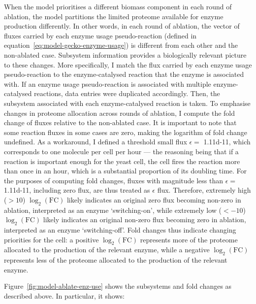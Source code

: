 When the model prioritises a different biomass component in each round of ablation, the model partitions the limited proteome available for enzyme production differently.
In other words, in each round of ablation, the vector of fluxes carried by each enzyme usage pseudo-reaction (defined in equation~\ref{eq:model-gecko-enzyme-usage}) is different from each other and the non-ablated case.
Subsystem information provides a biologically relevant picture to these changes.
More specifically, I match the flux carried by each enzyme usage pseudo-reaction to the enzyme-catalysed reaction that the enzyme is associated with.
If an enzyme usage pseudo-reaction is associated with multiple enzyme-catalysed reactions, data entries were duplicated accordingly.
Then, the subsystem associated with each enzyme-catalysed reaction is taken.
To emphasise changes in proteome allocation across rounds of ablation, I compute the fold change of fluxes relative to the non-ablated case.
It is important to note that some reaction fluxes in some cases are zero, making the logarithm of fold change undefined.
As a workaround, I defined a threshold small flux $\epsilon = $ \SI{1.11d-11}{\mmolgdwh}, which corresponds to one molecule per cell per hour --- the reasoning being that if a reaction is important enough for the yeast cell, the cell fires the reaction more than once in an hour, which is a substantial proportion of its doubling time.
For the purposes of computing fold changes, fluxes with magnitude less than $\epsilon = $ \SI{1.11d-11}{\mmolgdw}, including zero flux, are thus treated as $\epsilon$ flux.
Therefore, extremely high ($> 10$) $\log_{2}(\mathrm{FC})$ likely indicates an original zero flux becoming non-zero in ablation, interpreted as an enzyme `switching-on', while extremely low ($< -10$) $\log_{2}(\mathrm{FC})$ likely indicates an original non-zero flux becoming zero in ablation, interpreted as an enzyme `switching-off'.
Fold changes thus indicate changing priorities for the cell: a positive $\log_{2}(\mathrm{FC})$ represents more of the proteome allocated to the production of the relevant enzyme, while a negative $\log_{2}(\mathrm{FC})$ represents less of the proteome allocated to the production of the relevant enzyme.

Figure~\ref{fig:model-ablate-enz-use} shows the subsystems and fold changes as described above.
In particular, it shows:

